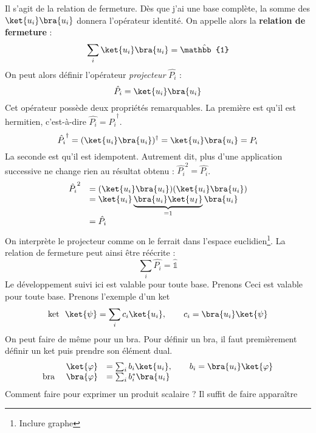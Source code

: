 Il s'agit de la relation de fermeture. Dès que j'ai une base complète, la somme des
$\ket{u_i}\bra{u_i}$ donnera l'opérateur identité. On appelle alors la \textbf{relation 
de fermeture} :
\begin{equation}
\sum_i \ket{u_i}\bra{u_i} = \hat{\mathbb{1}}
\end{equation}
On peut alors définir l'opérateur \textit{projecteur} $\hat{P_i}$ :
\begin{equation}
\hat{P_i} = \ket{u_i}\bra{u_i}
\end{equation}
Cet opérateur possède deux propriétés remarquables. La première est qu'il est hermitien, 
c'est-à-dire $\hat{P_i} = \hat{P_i}^\dagger$.
\begin{equation}
\hat{P_i}^\dagger = (\ket{u_i}\bra{u_i})^\dagger = \ket{u_i}\bra{u_i} = P_i
\end{equation}
La seconde est qu'il est idempotent. Autrement dit, plus d'une application successive ne 
change rien au résultat obtenu : $\hat{P_i}^2 = \hat{P_i}$.
\begin{equation}
\begin{array}{ll}
\hat{P_i}^2 &= (\ket{u_i}\bra{u_i})(\ket{u_i}\bra{u_i})\\
&= \ket{u_i}\underbrace{\bra{u_i}\ket{u_I}}_{=1}\bra{u_i}\\
&= \hat{P_i}
\end{array}
\end{equation}
On interprète le projecteur comme on le ferrait dans l'espace euclidien\footnote{Inclure 
graphe}. La relation de fermeture peut ainsi être réécrite :
\begin{equation}
\sum_i \hat{P_i} = \hat{\mathbb{1}}
\end{equation}
Le développement suivi ici est valable pour toute base. Prenons
Ceci est valable pour toute base. Prenons l'exemple d'un ket
\begin{equation}
\text{ket }\ \ket{\psi} = \sum_i c_i\ket{u_i},\qquad c_i = \bra{u_i}\ket{\psi}
\end{equation}
On peut faire de même pour un bra. Pour définir un bra, il faut premièrement définir 
un ket puis prendre son élément dual.
\begin{equation}
\begin{array}{lll}
& \ket{\varphi} &= \sum_i b_i\ket{u_i},\qquad b_i = \bra{u_i}\ket{\varphi}\\
\text{bra } & \bra{\varphi} &= \sum_i b_i^* \bra{u_i}
\end{array}
\end{equation}
Comment faire pour exprimer un produit scalaire ? Il suffit de faire apparaître 
